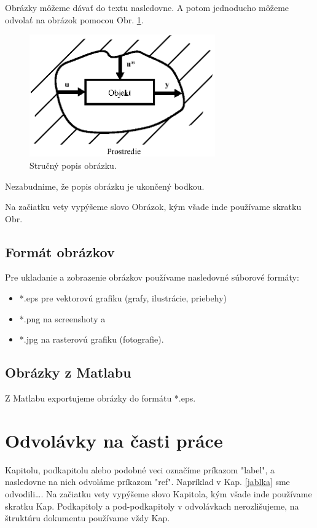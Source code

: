 Obrázky môžeme dávať do textu nasledovne. A potom jednoducho môžeme odvolať na obrázok pomocou Obr. \ref{OBRAZOK 1.1}.
\begin{figure}[!tbh]
\centering
\includegraphics[width=80mm]{obr/OBRAZOK1_1.eps}
\caption{Stručný popis obrázku.}\label{OBRAZOK 1.1}
\end{figure}
Nezabudnime, že popis obrázku je ukončený bodkou.

Na začiatku vety vypýšeme slovo Obrázok, kým všade inde používame skratku Obr.

\subsection{Formát obrázkov}

Pre ukladanie a zobrazenie obrázkov používame nasledovné súborové formáty:
\begin{itemize}
\item *.eps pre vektorovú grafiku (grafy, ilustrácie, priebehy)
\item *.png na screenshoty a
\item *.jpg na rasterovú grafiku (fotografie).
\end{itemize}

\subsection{Obrázky z Matlabu}

Z Matlabu exportujeme obrázky do formátu *.eps.

\section{Odvolávky na časti práce}
\label{hrusky}

Kapitolu, podkapitolu alebo podobné veci označíme príkazom "label", a nasledovne na nich odvoláme príkazom "ref". Napríklad v Kap. \ref{jablka} sme odvodili\ldots. 
Na začiatku vety vypýšeme slovo Kapitola, kým všade inde používame skratku Kap. Podkapitoly a pod-podkapitoly v odvolávkach nerozlišujeme, na štruktúru dokumentu používame vždy Kap.

